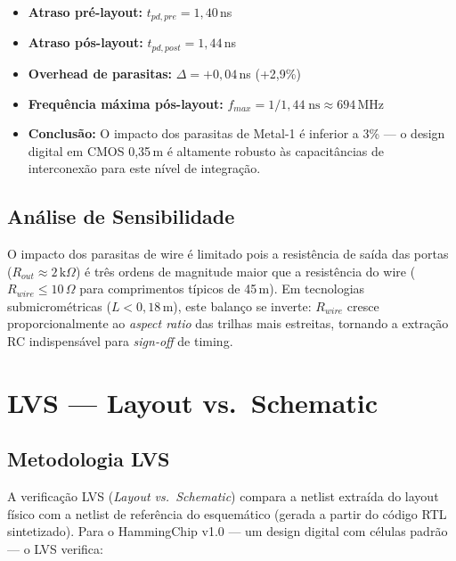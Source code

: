\documentclass[12pt,a4paper]{article}
\begin{document}
\begin{resultbox}
\begin{itemize}[leftmargin=1.5em]
  \item \textbf{Atraso pré-layout:} $t_{pd,pre} = 1{,}40$\,ns
  \item \textbf{Atraso pós-layout:} $t_{pd,post} = 1{,}44$\,ns
  \item \textbf{Overhead de parasitas:} $\Delta = +0{,}04$\,ns (+2,9\%)
  \item \textbf{Frequência máxima pós-layout:} $f_{max} = 1/1{,}44\;\text{ns} \approx 694$\,MHz
  \item \textbf{Conclusão:} O impacto dos parasitas de Metal-1 é inferior a 3\% --- o design digital em CMOS 0,35\,\textmu m é altamente robusto às capacitâncias de interconexão para este nível de integração.
\end{itemize}
\end{resultbox}

\subsection{Análise de Sensibilidade}

O impacto dos parasitas de wire é limitado pois a resistência de saída das portas ($R_{out} \approx 2\,\text{k}\Omega$) é três ordens de magnitude maior que a resistência do wire ($R_{wire} \leq 10\,\Omega$ para comprimentos típicos de 45\,\textmu m). Em tecnologias submicrométricas ($L < 0{,}18$\,\textmu m), este balanço se inverte: $R_{wire}$ cresce proporcionalmente ao \textit{aspect ratio} das trilhas mais estreitas, tornando a extração RC indispensável para \textit{sign-off} de timing.

\section{LVS --- Layout vs.\ Schematic}

\subsection{Metodologia LVS}

A verificação LVS (\textit{Layout vs.\ Schematic}) compara a netlist extraída do layout físico com a netlist de referência do esquemático (gerada a partir do código RTL sintetizado). Para o HammingChip v1.0 --- um design digital com células padrão --- o LVS verifica:
\end{document}
